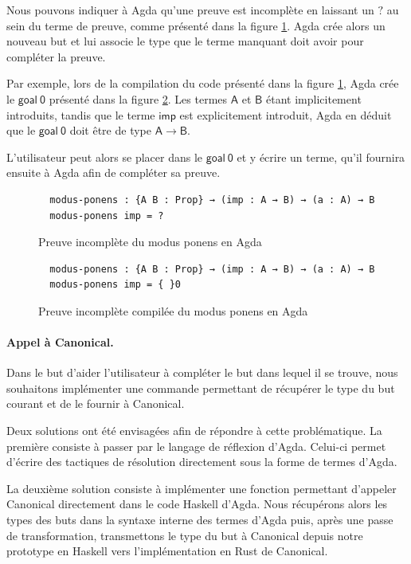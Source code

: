 \documentclass[11pt]{article}
\begin{document}
Nous pouvons indiquer à Agda qu’une preuve est incomplète en laissant un $\mathsf{?}$ au sein du terme de preuve, 
comme présenté dans la figure \ref{fig:agda-proof-uncomplete}. 
Agda crée alors un nouveau but et lui associe le type que le terme manquant doit avoir pour compléter la preuve.

Par exemple, lors de la compilation du code présenté dans la figure \ref{fig:agda-proof-uncomplete}, 
Agda crée le $\mathsf{goal\ 0}$ présenté dans la figure \ref{fig:agda-proof-uncomplete-compiled}. 
Les termes $\mathsf{A}$ et $\mathsf{B}$ étant implicitement introduits, tandis que le terme $\mathsf{imp}$ est explicitement introduit, 
Agda en déduit que le $\mathsf{goal\ 0}$ doit être de type $\mathsf{A \to B}$.

L’utilisateur peut alors se placer dans le $\mathsf{goal\ 0}$ et y écrire un terme, qu’il fournira ensuite à Agda afin de compléter sa preuve.
\begin{figure}[h]
\centering
\begin{verbatim}
  modus-ponens : {A B : Prop} → (imp : A → B) → (a : A) → B
  modus-ponens imp = ? 
\end{verbatim}
\caption{Preuve incomplète du modus ponens en Agda}
\label{fig:agda-proof-uncomplete}
\end{figure}

\begin{figure}[h]
\centering
\begin{verbatim}
  modus-ponens : {A B : Prop} → (imp : A → B) → (a : A) → B
  modus-ponens imp = { }0
\end{verbatim}
\caption{Preuve incomplète compilée du modus ponens en Agda}
\label{fig:agda-proof-uncomplete-compiled}
\end{figure}

\paragraph{Appel à Canonical.}
Dans le but d’aider l’utilisateur à compléter le but dans lequel il se trouve, 
nous souhaitons implémenter une commande permettant de récupérer le type du but courant et de le fournir à Canonical.

Deux solutions ont été envisagées afin de répondre à cette problématique. La première consiste à passer par le langage de réflexion d’Agda. 
Celui-ci permet d’écrire des tactiques de résolution directement sous la forme de termes d’Agda.

La deuxième solution consiste à implémenter une fonction permettant d’appeler Canonical directement dans le code Haskell d’Agda. 
Nous récupérons alors les types des buts dans la syntaxe interne des termes d’Agda puis, après une passe de transformation, 
transmettons le type du but à Canonical depuis notre prototype en Haskell vers l’implémentation en Rust de Canonical.
\end{document}

